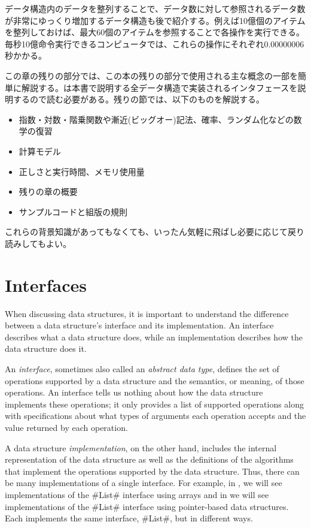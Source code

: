 データ構造内のデータを整列することで、データ数に対して参照されるデータ数が非常にゆっくり増加するデータ構造も後で紹介する。例えば10億個のアイテムを整列しておけば、最大60個のアイテムを参照することで各操作を実行できる。毎秒10億命令実行できるコンピュータでは、これらの操作にそれぞれ$0.00000006$秒かかる。

この章の残りの部分では、この本の残りの部分で使用される主な概念の一部を簡単に解説する。は本書で説明する全データ構造で実装されるインタフェースを説明するので読む必要がある。残りの節では、以下のものを解説する。
\begin{itemize}
\item 指数・対数・階乗関数や漸近(ビッグオー)記法、確率、ランダム化などの数学の復習
\item 計算モデル
\item 正しさと実行時間、メモリ使用量
\item 残りの章の概要
\item サンプルコードと組版の規則
\end{itemize}
これらの背景知識があってもなくても、いったん気軽に飛ばし必要に応じて戻り読みしてもよい。

\section{Interfaces}
When discussing data structures, it is important to understand the difference between a data structure's interface and its implementation.  An interface describes what a data structure does, while an implementation describes how the data structure does it.

An \emph{interface},   sometimes also called an \emph{abstract data type}, defines the set of operations supported by a data structure and the semantics, or meaning, of those operations.  An interface tells us nothing about how the data structure implements these operations; it only provides a list of supported operations along with specifications about what types of arguments each operation accepts and the value returned by each operation.

A data structure \emph{implementation}, on the other hand, includes the internal representation of the data structure as well as the definitions of the algorithms that implement the operations supported by the data structure.  Thus, there can be many implementations of a single interface.  For example, in , we will see implementations of the #List# interface using arrays and in  we will see implementations of the #List# interface using pointer-based data structures.  Each implements the same interface, #List#, but in different ways.

